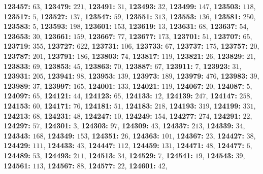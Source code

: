 \textsf{\bfseries 123457:} $63$, \textsf{\bfseries 123479:} $221$, \textsf{\bfseries 123491:} $31$, \textsf{\bfseries 123493:} $32$, \textsf{\bfseries 123499:} $147$, \textsf{\bfseries 123503:} $118$, \textsf{\bfseries 123517:} $5$, \textsf{\bfseries 123527:} $137$, \textsf{\bfseries 123547:} $59$, \textsf{\bfseries 123551:} $313$, \textsf{\bfseries 123553:} $136$, \textsf{\bfseries 123581:} $250$, \textsf{\bfseries 123583:} $5$, \textsf{\bfseries 123593:} $198$, \textsf{\bfseries 123601:} $153$, \textsf{\bfseries 123619:} $13$, \textsf{\bfseries 123631:} $68$, \textsf{\bfseries 123637:} $54$, \textsf{\bfseries 123653:} $30$, \textsf{\bfseries 123661:} $159$, \textsf{\bfseries 123667:} $77$, \textsf{\bfseries 123677:} $173$, \textsf{\bfseries 123701:} $51$, \textsf{\bfseries 123707:} $65$, \textsf{\bfseries 123719:} $355$, \textsf{\bfseries 123727:} $622$, \textsf{\bfseries 123731:} $106$, \textsf{\bfseries 123733:} $67$, \textsf{\bfseries 123737:} $175$, \textsf{\bfseries 123757:} $20$, \textsf{\bfseries 123787:} $201$, \textsf{\bfseries 123791:} $186$, \textsf{\bfseries 123803:} $74$, \textsf{\bfseries 123817:} $119$, \textsf{\bfseries 123821:} $26$, \textsf{\bfseries 123829:} $21$, \textsf{\bfseries 123833:} $69$, \textsf{\bfseries 123853:} $45$, \textsf{\bfseries 123863:} $70$, \textsf{\bfseries 123887:} $67$, \textsf{\bfseries 123911:} $7$, \textsf{\bfseries 123923:} $31$, \textsf{\bfseries 123931:} $205$, \textsf{\bfseries 123941:} $98$, \textsf{\bfseries 123953:} $139$, \textsf{\bfseries 123973:} $189$, \textsf{\bfseries 123979:} $476$, \textsf{\bfseries 123983:} $39$, \textsf{\bfseries 123989:} $37$, \textsf{\bfseries 123997:} $165$, \textsf{\bfseries 124001:} $133$, \textsf{\bfseries 124021:} $119$, \textsf{\bfseries 124067:} $20$, \textsf{\bfseries 124087:} $5$, \textsf{\bfseries 124097:} $65$, \textsf{\bfseries 124121:} $44$, \textsf{\bfseries 124123:} $65$, \textsf{\bfseries 124133:} $12$, \textsf{\bfseries 124139:} $247$, \textsf{\bfseries 124147:} $258$, \textsf{\bfseries 124153:} $60$, \textsf{\bfseries 124171:} $76$, \textsf{\bfseries 124181:} $51$, \textsf{\bfseries 124183:} $218$, \textsf{\bfseries 124193:} $319$, \textsf{\bfseries 124199:} $331$, \textsf{\bfseries 124213:} $68$, \textsf{\bfseries 124231:} $48$, \textsf{\bfseries 124247:} $10$, \textsf{\bfseries 124249:} $154$, \textsf{\bfseries 124277:} $274$, \textsf{\bfseries 124291:} $22$, \textsf{\bfseries 124297:} $57$, \textsf{\bfseries 124301:} $3$, \textsf{\bfseries 124303:} $97$, \textsf{\bfseries 124309:} $43$, \textsf{\bfseries 124337:} $213$, \textsf{\bfseries 124339:} $34$, \textsf{\bfseries 124343:} $168$, \textsf{\bfseries 124349:} $153$, \textsf{\bfseries 124351:} $26$, \textsf{\bfseries 124363:} $101$, \textsf{\bfseries 124367:} $23$, \textsf{\bfseries 124427:} $38$, \textsf{\bfseries 124429:} $111$, \textsf{\bfseries 124433:} $43$, \textsf{\bfseries 124447:} $112$, \textsf{\bfseries 124459:} $131$, \textsf{\bfseries 124471:} $48$, \textsf{\bfseries 124477:} $6$, \textsf{\bfseries 124489:} $53$, \textsf{\bfseries 124493:} $211$, \textsf{\bfseries 124513:} $34$, \textsf{\bfseries 124529:} $7$, \textsf{\bfseries 124541:} $19$, \textsf{\bfseries 124543:} $39$, \textsf{\bfseries 124561:} $113$, \textsf{\bfseries 124567:} $88$, \textsf{\bfseries 124577:} $22$, \textsf{\bfseries 124601:} $42$, 
